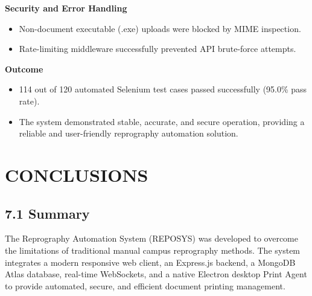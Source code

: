 \documentclass[12pt,a4paper]{report}
\begin{document}
\noindent\textbf{Security and Error Handling}
\begin{itemize}[leftmargin=0.35in, itemsep=1pt]
  \item Non-document executable (.exe) uploads were blocked by MIME inspection.
  \item Rate-limiting middleware successfully prevented API brute-force attempts.
\end{itemize}

\noindent\textbf{Outcome}
\begin{itemize}[leftmargin=0.35in, itemsep=1pt]
  \item 114 out of 120 automated Selenium test cases passed successfully (95.0\% pass rate).
  \item The system demonstrated stable, accurate, and secure operation, providing a reliable and user-friendly reprography automation solution.
\end{itemize}

\newpage
\chapter{CONCLUSIONS}

\section{7.1 Summary}
The Reprography Automation System (REPOSYS) was developed to overcome the limitations of traditional manual campus reprography methods. The system integrates a modern responsive web client, an Express.js backend, a MongoDB Atlas database, real-time WebSockets, and a native Electron desktop Print Agent to provide automated, secure, and efficient document printing management.
\end{document}
